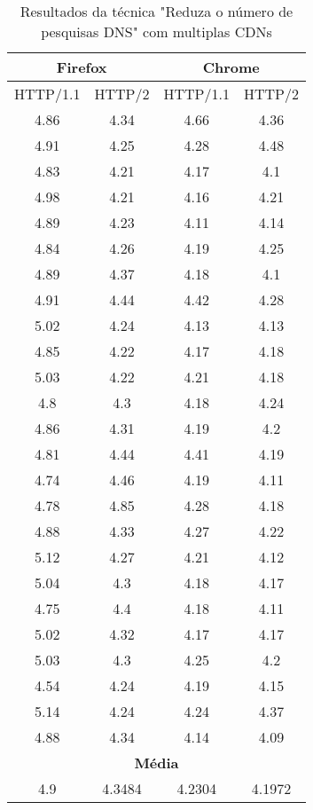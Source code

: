\begin{table}[h]
	\centering
	\caption{Resultados da técnica "Reduza o número de pesquisas DNS" com multiplas CDNs}
	\label{resultados-reduzaonumerodepesquisasdns-multiplas}
	\begin{tabular}{cccc}
		\hline
		\multicolumn{2}{c}{\textbf{Firefox}} & \multicolumn{2}{c}{\textbf{Chrome}} \\
		\hline
		HTTP/1.1 & HTTP/2 & HTTP/1.1 & HTTP/2 \\
		\hline
		4.86 & 4.34 & 4.66 & 4.36 \\
		4.91 & 4.25 & 4.28 & 4.48 \\
		4.83 & 4.21 & 4.17 & 4.1 \\
		4.98 & 4.21 & 4.16 & 4.21 \\
		4.89 & 4.23 & 4.11 & 4.14 \\
		4.84 & 4.26 & 4.19 & 4.25 \\
		4.89 & 4.37 & 4.18 & 4.1 \\
		4.91 & 4.44 & 4.42 & 4.28 \\
		5.02 & 4.24 & 4.13 & 4.13 \\
		4.85 & 4.22 & 4.17 & 4.18 \\
		5.03 & 4.22 & 4.21 & 4.18 \\
		4.8 & 4.3 & 4.18 & 4.24 \\
		4.86 & 4.31 & 4.19 & 4.2 \\
		4.81 & 4.44 & 4.41 & 4.19 \\ 
		4.74 & 4.46 & 4.19 & 4.11 \\
		4.78 & 4.85 & 4.28 & 4.18 \\
		4.88 & 4.33 & 4.27 & 4.22 \\ 
		5.12 & 4.27 & 4.21 & 4.12 \\
		5.04 & 4.3 & 4.18 & 4.17 \\
		4.75 & 4.4 & 4.18 & 4.11 \\
		5.02 & 4.32 & 4.17 & 4.17 \\
		5.03 & 4.3 & 4.25 & 4.2 \\
		4.54 & 4.24 & 4.19 & 4.15 \\
		5.14 & 4.24 & 4.24 & 4.37 \\
		4.88 & 4.34 & 4.14 & 4.09 \\
		\hline
		\multicolumn{4}{c}{\textbf{Média}} \\
		4.9 & 4.3484 & 4.2304 & 4.1972 \\
		\hline
	\end{tabular}
\end{table}